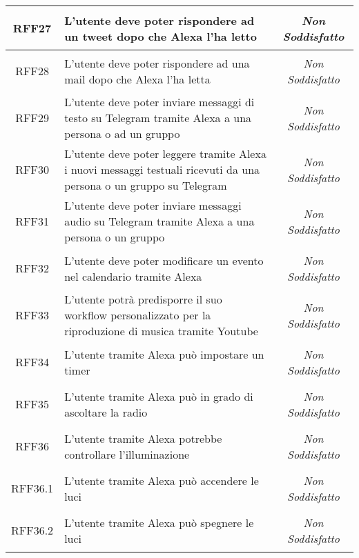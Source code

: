 \begin{longtable}{|c|>{\centering}m{7cm}|c|}
	\hypertarget{RFF27}{RFF27} & L'utente deve poter rispondere ad un tweet dopo che Alexa l'ha letto & {\textit{Non Soddisfatto}}\\ \hline
	
	\hypertarget{RFF28}{RFF28} & L'utente deve poter rispondere ad una mail dopo che Alexa l'ha letta & {\textit{Non Soddisfatto}}\\ \hline
	
	\hypertarget{RFF29}{RFF29} & L'utente deve poter inviare messaggi di testo su Telegram tramite Alexa a una persona o ad un gruppo & {\textit{Non Soddisfatto}}\\ \hline
	
	\hypertarget{RFF30}{RFF30} &  L'utente deve poter leggere tramite Alexa i nuovi messaggi testuali ricevuti da una persona o un gruppo su Telegram & {\textit{Non Soddisfatto}}\\ \hline
	
	\hypertarget{RFF31}{RFF31} & L'utente deve poter inviare messaggi audio su Telegram tramite Alexa a una persona o un gruppo & {\textit{Non Soddisfatto}}\\ \hline
	
	\hypertarget{RFF32}{RFF32} & L'utente deve poter modificare un evento nel calendario tramite Alexa & {\textit{Non Soddisfatto}}\\ \hline
	
	\hypertarget{RFF33}{RFF33} & L'utente potrà predisporre il suo workflow personalizzato per la riproduzione di musica tramite Youtube & {\textit{Non Soddisfatto}}\\ \hline
	
	\hypertarget{RFF34}{RFF34} & L'utente tramite Alexa può impostare un timer & {\textit{Non Soddisfatto}}\\ \hline
	
	\hypertarget{RFF35}{RFF35} & L'utente tramite Alexa può in grado di ascoltare la radio & {\textit{Non Soddisfatto}}\\ \hline
	
	\hypertarget{RFF36}{RFF36} & L'utente tramite Alexa potrebbe controllare l'illuminazione & {\textit{Non Soddisfatto}}\\ \hline
	
	\hypertarget{RFF36.1}{RFF36.1} & L'utente tramite Alexa può accendere le luci & {\textit{Non Soddisfatto}}\\ \hline
	
	\hypertarget{RFF36.2}{RFF36.2} & L'utente tramite Alexa può spegnere le luci & {\textit{Non Soddisfatto}}\\ \hline
	

\end{longtable}
